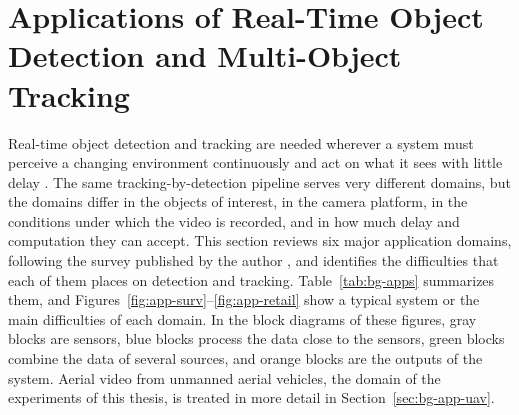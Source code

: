 \section{Applications of Real-Time Object Detection and Multi-Object Tracking}\label{sec:bg-apps}
Real-time object detection and tracking are needed wherever a system must perceive a changing environment continuously and act on what it sees with little delay \cite{li2025motreview,ismail2026realtime}. The same tracking-by-detection pipeline serves very different domains, but the domains differ in the objects of interest, in the camera platform, in the conditions under which the video is recorded, and in how much delay and computation they can accept. This section reviews six major application domains, following the survey published by the author \cite{ismail2026realtime}, and identifies the difficulties that each of them places on detection and tracking. Table~\ref{tab:bg-apps} summarizes them, and Figures~\ref{fig:app-surv}--\ref{fig:app-retail} show a typical system or the main difficulties of each domain. In the block diagrams of these figures, gray blocks are sensors, blue blocks process the data close to the sensors, green blocks combine the data of several sources, and orange blocks are the outputs of the system. Aerial video from unmanned aerial vehicles, the domain of the experiments of this thesis, is treated in more detail in Section~\ref{sec:bg-app-uav}.

